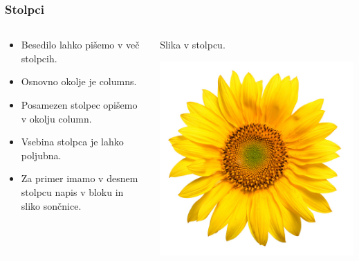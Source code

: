 \documentclass{beamer}
\begin{document}
\begin{frame}
\frametitle   {Stolpci}
   \begin{columns}
       \begin{column}{0.5 \textwidth}
       \begin{itemize}
\item            Besedilo lahko pišemo v več stolpcih.
\item            Osnovno okolje je columns.
\item             Posamezen stolpec opišemo v okolju column.
\item             Vsebina stolpca je lahko poljubna.
\item             Za primer imamo v desnem stolpcu napis v bloku in sliko sončnice.
         \end{itemize}
          \end{column}

         \begin{column}{0.5 \textwidth}
            \begin{exampleblock}{}
            \centering
            Slika v stolpcu.
            \end{exampleblock}
            \includegraphics{soncnica.jpg}
            \centering
          \end{column}
     \end{columns}
\end{frame}
\end{document}

